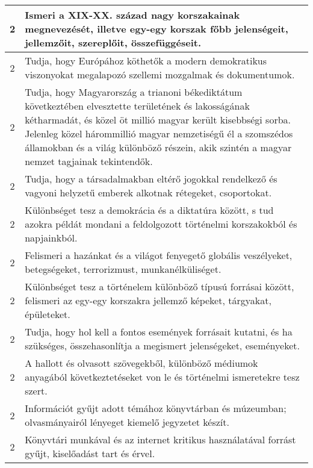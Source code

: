 \begin{longtable}{c | p{12cm} }
 \\ \hline
                                          2 &  Ismeri a XIX-XX. század nagy korszakainak megnevezését, illetve egy-egy korszak főbb jelenségeit, jellemzőit, szereplőit, összefüggéseit. \\ \hline
                                          2 &  Tudja, hogy Európához köthetők a modern demokratikus viszonyokat megalapozó szellemi mozgalmak és dokumentumok. \\ \hline
                                          2 &  Tudja, hogy Magyarország a trianoni békediktátum következtében elvesztette területének és lakosságának kétharmadát, és közel öt millió magyar került kisebbségi sorba. Jelenleg közel hárommillió magyar nemzetiségű él a szomszédos államokban és a világ különböző részein, akik szintén a magyar nemzet tagjainak tekintendők. \\ \hline
                                          2 &  Tudja, hogy a társadalmakban eltérő jogokkal rendelkező és vagyoni helyzetű emberek alkotnak rétegeket, csoportokat. \\ \hline
                                          2 &  Különbséget tesz a demokrácia és a diktatúra között, s tud azokra példát mondani a feldolgozott történelmi korszakokból és napjainkból. \\ \hline
                                          2 &  Felismeri a hazánkat és a világot fenyegető globális veszélyeket, betegségeket, terrorizmust, munkanélküliséget. \\ \hline
                                          2 &  Különbséget tesz a történelem különböző típusú forrásai között, felismeri az egy-egy korszakra jellemző képeket, tárgyakat, épületeket. \\ \hline
                                          2 &  Tudja, hogy hol kell a fontos események forrásait kutatni, és ha szükséges, összehasonlítja a megismert jelenségeket, eseményeket. \\ \hline
                                          2 &  A hallott és olvasott szövegekből, különböző médiumok anyagából következtetéseket von le és történelmi ismeretekre tesz szert. \\ \hline
                                          2 &  Információt gyűjt adott témához könyvtárban és múzeumban; olvasmányairól lényeget kiemelő jegyzetet készít. \\ \hline
                                          2 &  Könyvtári munkával és az internet kritikus használatával forrást gyűjt, kiselőadást tart és érvel. \\ \hline

\end{longtable}
